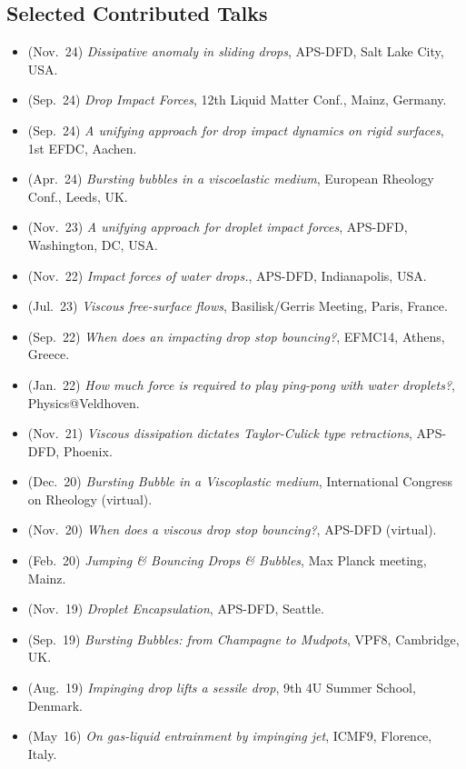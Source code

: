 \documentclass[10pt,a4paper,colorlinks,linkcolor=blue,urlcolor=blue,citecolor=blue]{moderncv}
\begin{document}
\subsection{\faComments\hspace{0.3em}Selected Contributed Talks}
\begin{itemize}[leftmargin=1.5em]
\item[\textbullet] (Nov.~24) \emph{Dissipative anomaly in sliding drops}, APS-DFD, Salt Lake City, USA.
\item[\textbullet] (Sep.~24) \emph{Drop Impact Forces}, 12th Liquid Matter Conf., Mainz, Germany.
\item[\textbullet] (Sep.~24) \emph{A unifying approach for drop impact dynamics on rigid surfaces}, 1st EFDC, Aachen.
\item[\textbullet] (Apr.~24) \emph{Bursting bubbles in a viscoelastic medium}, European Rheology Conf., Leeds, UK.
\item[\textbullet] (Nov.~23) \emph{A unifying approach for droplet impact forces}, APS-DFD, Washington, DC, USA. \href{https://youtu.be/3S_hwkMCx6U?si=01tvC4RHCoga62bC}{\color{red}\faYoutube}
\item[\textbullet] (Nov.~22) \emph{Impact forces of water drops.}, APS-DFD, Indianapolis, USA. \href{https://youtu.be/U0g67zV70hw}{\color{red}\faYoutube}
\item[\textbullet] (Jul.~23) \emph{Viscous free-surface flows}, Basilisk/Gerris Meeting, Paris, France.
\item[\textbullet] (Sep.~22) \emph{When does an impacting drop stop bouncing?}, EFMC14, Athens, Greece.
\item[\textbullet] (Jan.~22) \emph{How much force is required to play ping-pong with water droplets?}, Physics@Veldhoven. \href{https://youtu.be/wmEYeQRPi0Q?si=u8Ex64dYLHQ8TxCE}{\color{red}\faYoutube}
\item[\textbullet] (Nov.~21) \emph{Viscous dissipation dictates Taylor-Culick type retractions}, APS-DFD, Phoenix. \href{https://youtu.be/d0tMlpbMIqY?si=V-7Lh5g-zj1j7al6}{\color{red}\faYoutube}
\item[\textbullet] (Dec.~20) \emph{Bursting Bubble in a Viscoplastic medium}, International Congress on Rheology (virtual). \href{https://youtu.be/52D6nfaHbYg?si=lE3oQGiMZe3UCT6j}{\color{red}\faYoutube}
\item[\textbullet] (Nov.~20) \emph{When does a viscous drop stop bouncing?}, APS-DFD (virtual). \href{https://youtu.be/9JCV9JFwr2A?si=Vs1ljwdmZrzHUOXX}{\color{red}\faYoutube}
\item[\textbullet] (Feb.~20) \emph{Jumping \& Bouncing Drops \& Bubbles}, Max Planck meeting, Mainz.
\item[\textbullet] (Nov.~19) \emph{Droplet Encapsulation}, APS-DFD, Seattle.
\item[\textbullet] (Sep.~19) \emph{Bursting Bubbles: from Champagne to Mudpots}, VPF8, Cambridge, UK.
\item[\textbullet] (Aug.~19) \emph{Impinging drop lifts a sessile drop}, 9th 4U Summer School, Denmark.
\item[\textbullet] (May~16) \emph{On gas-liquid entrainment by impinging jet}, ICMF9, Florence, Italy.
\end{itemize}
\end{document}
